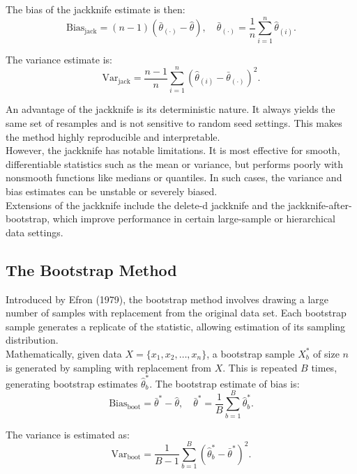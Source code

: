\documentclass{article}
\begin{document}
The bias of the jackknife estimate is then:
\[
\text{Bias}_{\text{jack}} = (n - 1)(\bar{\theta}_{(\cdot)} - \hat{\theta}), \quad \bar{\theta}_{(\cdot)} = \frac{1}{n} \sum_{i=1}^{n} \hat{\theta}_{(i)}.
\]

The variance estimate is:
\[
\text{Var}_{\text{jack}} = \frac{n - 1}{n} \sum_{i=1}^{n} (\hat{\theta}_{(i)} - \bar{\theta}_{(\cdot)})^2.
\]

An advantage of the jackknife is its deterministic nature. It always yields the same set of resamples and is not sensitive to random seed settings. This makes the method highly reproducible and interpretable. \\

However, the jackknife has notable limitations. It is most effective for smooth, differentiable statistics such as the mean or variance, but performs poorly with nonsmooth functions like medians or quantiles. In such cases, the variance and bias estimates can be unstable or severely biased. \\

Extensions of the jackknife include the delete-d jackknife and the jackknife-after-bootstrap, which improve performance in certain large-sample or hierarchical data settings. \\

\subsection{The Bootstrap Method}

Introduced by Efron (1979), the bootstrap method involves drawing a large number of samples with replacement from the original data set. Each bootstrap sample generates a replicate of the statistic, allowing estimation of its sampling distribution. \\

Mathematically, given data \( X = \{x_1, x_2, \dots, x_n\} \), a bootstrap sample \( X^*_b \) of size \( n \) is generated by sampling with replacement from \( X \). This is repeated \( B \) times, generating bootstrap estimates \( \hat{\theta}_b^* \). The bootstrap estimate of bias is:
\[
\text{Bias}_{\text{boot}} = \bar{\theta}^* - \hat{\theta}, \quad \bar{\theta}^* = \frac{1}{B} \sum_{b=1}^{B} \hat{\theta}_b^*.
\]

The variance is estimated as:
\[
\text{Var}_{\text{boot}} = \frac{1}{B - 1} \sum_{b=1}^{B}(\hat{\theta}_b^* - \bar{\theta}^*)^2.
\]
\end{document}
